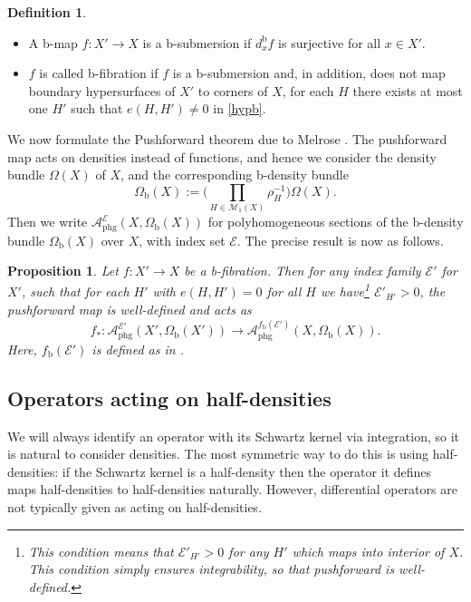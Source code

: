 \documentclass[JEP,XML,SOM,Unicode,NoFloatCountersInSection,published]{cedram}
\theoremstyle{plain}
\newtheorem{Prop}[Th]{Proposition}
\theoremstyle{definition}
\newtheorem{defn}[Th]{Definition}
\newcommand\calE{{\mathcal E}}
\newcommand\calM{{\mathcal M}}
\newcommand {\phg}{{\mathrm{phg}}}
\newcommand{\bb}{{\mathrm{b}}}
\begin{document}
\skpt
\begin{defn}\label{b-fib}
\begin{itemize}
\item A b-map $f: X' \to X$ is a b-submersion if $d_{x}^{\bb}f$ is surjective
for all $x \in X'$.
\item $f$ is called b-fibration if $f$ is a b-submersion and, in addition,
does not map boundary hypersurfaces of $X'$ to
corners of $X$, \ie for each $H$ there exists
at most one $H'$ such that $e(H,H') \neq 0$ in \eqref{hypb}.
\end{itemize}
\end{defn}

We now formulate the Pushforward theorem due to Melrose \cite{melrose1993atiyah}.
The pushforward map acts on densities instead of functions, and hence we consider the
density bundle $\Omega(X)$ of $X$, and the corresponding b-density
bundle
\begin{equation}
\label{eqn:def omega b}
\Omega_\bb(X) := \biggl(\prod\limits_{H\in\calM_1(X)} \rho_H^{-1}\biggr) \Omega(X).
\end{equation}
Then we write $\mathcal{A}_{\phg}^{\mathcal{E}}(X, \Omega_\bb(X))$ for polyhomogeneous
sections of the b-density bundle $\Omega_\bb(X)$ over $X$, with index set $\mathcal{E}$.
The precise result is now as follows.

\begin{Prop} \label{pushforward}
Let $f : X' \to X$ be a b-fibration.
Then for any index family $\mathcal{E}'$
for $X'$, such that for each
$H'$ with $e(H,H') = 0$ for all $H$ we have\footnote{This condition means that $\calE'_{H'}> 0$ for
any $H'$ which maps into interior of $X$. This condition simply ensures
integrability, so that pushforward is well-defined.} $\calE'_{H'} > 0$,
the pushforward map is well-defined and acts as
\[
f_{*}: \mathcal{A}_{\phg}^{\mathcal{E}'}(X',\Omega_\bb(X'))
\to \mathcal{A}_{\phg}^{f_\bb
(\mathcal{E}')}(X,\Omega_\bb(X)).
\]
Here, $f_\bb(\mathcal{E}')$ is defined as in \cite[A.15]{mazzeorafe1991elliptic}.
\end{Prop}

\subsection{Operators acting on half-densities} \label{subsec:half densities}
We will always identify an operator with its Schwartz kernel via integration, so
it is natural to consider densities. The most symmetric way to do this is
using half-densities: if the Schwartz kernel is a half-density then the operator
it defines maps half-densities to half-densities naturally. However, differential operators are
not typically given as acting on half-densities.
\end{document}
